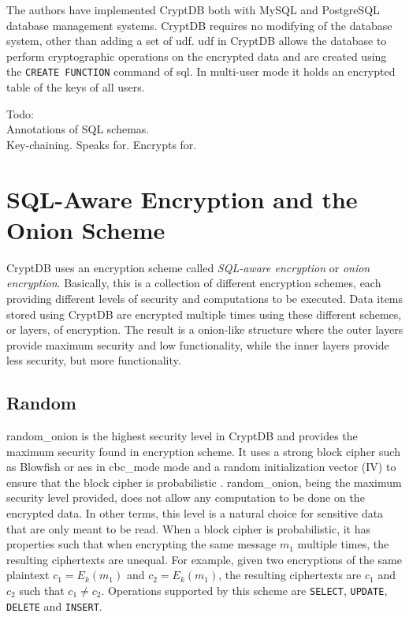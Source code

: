 The authors \citep{CryptDB_Main_Paper} have implemented CryptDB both with MySQL and PostgreSQL database management systems. CryptDB requires no modifying of the database system, other than adding a set of \Gls{udf}. \Gls{udf} in CryptDB allows the database to perform cryptographic operations on the encrypted data and are created using the \verb!CREATE FUNCTION! command of \gls{sql}. In multi-user mode it holds an encrypted table of the keys of all users.


Todo:\\
Annotations of SQL schemas.\\
Key-chaining. Speaks for. Encrypts for.\\


\section{SQL-Aware Encryption and the Onion Scheme}

CryptDB uses an encryption scheme called \emph{SQL-aware encryption} or \textit{onion encryption}. Basically, this is a collection of different encryption schemes, each providing different levels of security and computations to be executed. Data items stored using CryptDB are encrypted multiple times using these different schemes, or layers, of encryption. The result is a onion-like structure where the outer layers provide maximum security and low functionality, while the inner layers provide less security, but more functionality.


\subsection{Random}
\Gls{random_onion} is the highest security level in CryptDB and provides the maximum security found in encryption scheme. It uses a strong block cipher such as Blowfish or \Gls{aes} in \Gls{cbc_mode} mode and a random initialization vector (IV) to ensure that the block cipher is probabilistic \citep{CryptDB_Main_Paper}. \Gls{random_onion}, being the maximum security level provided, does not allow any computation to be done on the encrypted data. In other terms, this level is a natural choice for sensitive data that are only meant to be read. When a block cipher is probabilistic, it has properties such that when encrypting the same message $m_1$ multiple times, the resulting ciphertexts are unequal. For example, given two encryptions of the same plaintext $c_1 = E_k(m_1)$ and $c_2 = E_k(m_1)$, the resulting ciphertexts are $c_1$ and $c_2$ such that $c_1 \neq c_2$. Operations supported by this scheme are \verb!SELECT!, \verb!UPDATE!, \verb!DELETE! and \verb!INSERT!.


